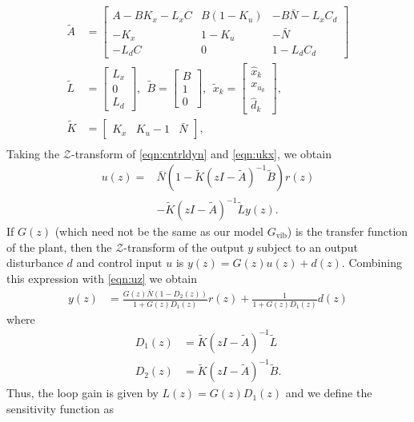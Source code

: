 \documentclass[twocolumn,twoside]{IEEEtran}
\newcommand{\Gv}{\ensuremath{G_{\text{vib}}}\xspace}
\begin{document}
\begin{align*}
  \tilde{A} &= \begin{bmatrix}
    A-BK_x-L_xC & B(1-K_u) & -B\bar{N} - L_xC_d\\
    -K_x        & 1-K_u    & -\bar{N} \\
    -L_dC      & 0        & 1-L_dC_d
  \end{bmatrix}\\
  \tilde{L} &= \begin{bmatrix} L_x \\ 0 \\ L_d  \end{bmatrix},\:\:
  \tilde{B} = \begin{bmatrix} B \\ 1 \\0\end{bmatrix},\:\:
  \tilde{x}_k = \begin{bmatrix} \hat{x}_k \\ x_{u_k} \\ \hat{d}_k\end{bmatrix},\\
  \tilde{K} &= \begin{bmatrix}K_x & K_u-1 & \bar{N}\end{bmatrix},\\
\end{align*}
Taking the $\mathcal{Z}$-transform of \eqref{eqn:cntrldyn} and \eqref{eqn:ukx}, we obtain
\begin{align}
  u(z) =&  \bar{N}(1-\tilde{K}(zI-\tilde{A})^{-1}\tilde{B})r(z) \nonumber\\
       & -\tilde{K}(zI - \tilde{A})^{-1}\tilde{L}y(z).\label{eqn:uz}
\end{align}
If $G(z)$ (which need not be the same as our model $\Gv$) is the transfer function of the plant, then the $\mathcal{Z}$-transform of the output $y$ subject to an output disturbance $d$ and control input $u$ is $y(z) = G(z)u(z) + d(z)$. Combining this expression with \eqref{eqn:uz} we obtain 
\begin{align}
  y(z) &= \frac{G(z)\bar{N}(1-D_2(z))}{1 + G(z)D_1(z)} r(z) + \frac{1}{1 + G(z)D_1(z)}d(z)\label{eqn:cltf}
\end{align}
where
\begin{align*}
  D_1(z) &= \tilde{K}(zI -\tilde{A})^{-1}\tilde{L}\\
  D_2(z) &= \tilde{K}(zI -\tilde{A})^{-1}\tilde{B}.
\end{align*}
Thus, the loop gain is given by $L(z) = G(z)D_1(z)$ and we define the sensitivity function as
\end{document}
